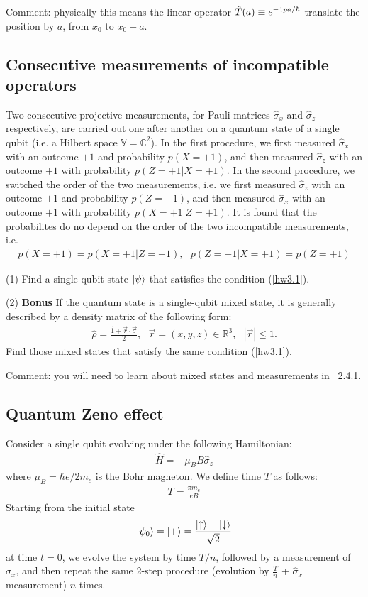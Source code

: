 Comment: physically this means the linear operator $\hat T(a)\equiv e^{-\hspace{1pt}\mathrm{i}\hspace{1pt} pa/\hbar}$ translate the position by $a$, from $x_0$ to $x_0+a$. 

\subsection{Consecutive measurements of incompatible operators}

Two consecutive projective measurements, for Pauli matrices $\hat \sigma_x$ and $\hat \sigma_z$ respectively, are carried out one after another on a quantum state of a single qubit (i.e. a Hilbert space $\mathbb{V}=\mathbb{C}^2$). In the first procedure, we first measured $\hat\sigma_x$ with an outcome $+1$ and probability $p(X=+1)$, and then measured $\hat\sigma_z$ with an outcome $+1$ with probability $p(Z=+1|X=+1)$. In the second procedure, we switched the order of the two measurements, i.e. we first measured $\hat\sigma_z$ with an outcome $+1$ and probability $p(Z=+1)$, and then measured $\hat\sigma_x$ with an outcome $+1$ with probability $p(X=+1|Z=+1)$. It is found that the probabilites do no depend on the order of the two incompatible measurements, i.e.
\begin{align}\label{hw3.1}
p(X=+1)=p(X=+1|Z=+1),~~~p(Z=+1|X=+1)=p(Z=+1)
\end{align}

(1) Find a single-qubit state $|{\psi}\rangle$ that satisfies the condition (\ref{hw3.1}). 

(2) \textbf{Bonus} If the quantum state is a single-qubit mixed state, it is generally described by a density matrix of the following form:
\begin{align}
\hat\rho=\frac{\hat 1+\vec r\cdot\vec\sigma}2,~~~\vec r=(x,y,z)\in\mathbb{R}^3,~~~|\vec r|\leq1.
\end{align}
Find those mixed states that satisfy the same condition (\ref{hw3.1}). 

Comment: you will need to learn about mixed states and measurements in \nielsen~2.4.1.

\subsection{Quantum Zeno effect}

Consider a single qubit evolving under the following Hamiltonian:
\begin{align}
\hat H=-\mu_BB\hat\sigma_z
\end{align}
where $\mu_B=\hbar e/2m_e$ is the Bohr magneton. We define time $T$ as follows:
\begin{align}
T=\frac{\pi m_e}{eB}
\end{align}
Starting from the initial state
\begin{align}
|{\psi_0}\rangle=|{+}\rangle=\frac{|{\uparrow}\rangle+|{\downarrow}\rangle}{\sqrt2}
\end{align}
at time $t=0$, we evolve the system by time $T/n$, followed by a measurement of $\hat\sigma_x$, and then repeat the same 2-step procedure (evolution by $\frac{T}{n}$ + $\hat\sigma_x$ measurement) $n$ times. 

